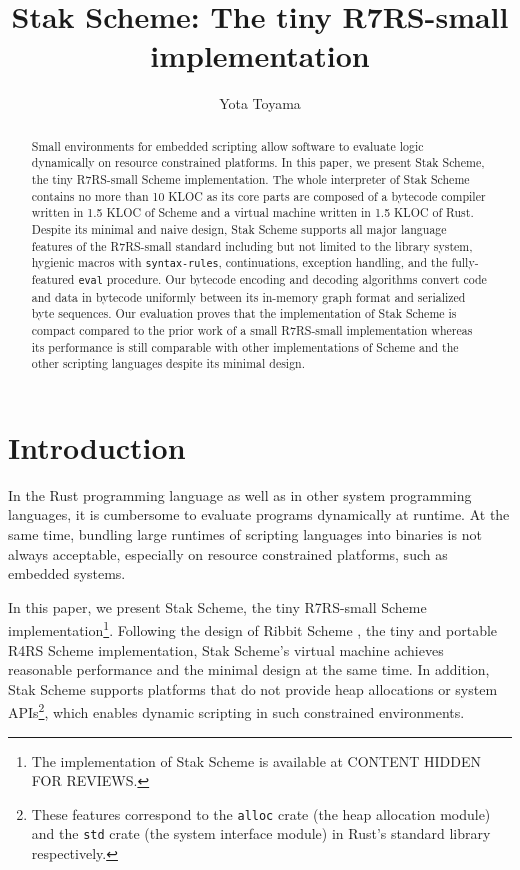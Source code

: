 \documentclass[sigplan, anonymous, review]{acmart}
\newcommand{\draft}[1]{CONTENT HIDDEN FOR REVIEWS}
\begin{document}
\title{Stak Scheme: The tiny R7RS-small implementation}
\author{Yota Toyama}

\begin{abstract}
  Small environments for embedded scripting allow software to
  evaluate logic dynamically on resource constrained platforms.
  In this paper, we present Stak Scheme, the tiny R7RS-small
  Scheme implementation.
  The whole interpreter of Stak Scheme contains no more than 10 KLOC as
  its core parts are composed of a bytecode compiler written in 1.5
  KLOC of Scheme
  and a virtual machine written in 1.5 KLOC of Rust.
  Despite its minimal and naive design, Stak Scheme
  supports all major language features of the R7RS-small standard including
  but not limited to the library system, hygienic macros with
  \texttt{syntax-rules}, continuations, exception handling, and the
  fully-featured \texttt{eval} procedure.
  Our bytecode encoding and decoding algorithms convert code and
  data in bytecode uniformly
  between its in-memory graph format and serialized byte sequences.
  Our evaluation proves that the implementation of Stak Scheme is
  compact compared to the prior work of a small R7RS-small implementation
  whereas its performance is still
  comparable with other implementations of Scheme and the other
  scripting languages despite its minimal design.
\end{abstract}

\maketitle

\section{Introduction}

In the Rust programming language as well as in other system
programming languages, it is cumbersome to evaluate programs
dynamically at runtime. At the same time, bundling large runtimes of
scripting languages into binaries is not always acceptable,
especially on resource constrained platforms, such as embedded systems.

In this paper, we present Stak Scheme, the tiny R7RS-small Scheme
implementation\footnote{
  The implementation of Stak Scheme is available at
  \draft{\url{https://github.com/raviqqe/stak}}.
}.
Following the design of Ribbit Scheme
\cite{ribbit2023}, the tiny and
portable R4RS Scheme implementation, Stak Scheme's virtual machine
achieves reasonable performance and the minimal design
at the same time.
In addition, Stak Scheme supports platforms that do not provide
heap allocations or system APIs\footnote{
  These features correspond to the \texttt{alloc}
  crate (the heap allocation module) and the \texttt{std} crate (the
  system interface module) in Rust's standard library respectively.
}, which enables dynamic scripting in such constrained environments.
\end{document}
